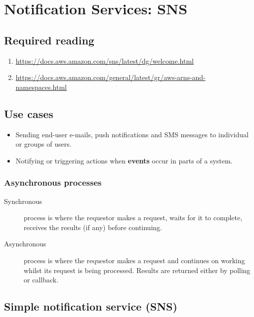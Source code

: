 \chapter{Notification Services: SNS}
\label{ch:sns}
  
\section*{Required reading}\label{required-reading}

\begin{enumerate}
\item
  \url{https://docs.aws.amazon.com/sns/latest/dg/welcome.html}
\item
  \url{https://docs.aws.amazon.com/general/latest/gr/aws-arns-and-namespaces.html}
\end{enumerate}

\section{Use cases}\label{use-cases}

\begin{itemize}
\item
  Sending end-user e-mails, push notifications and SMS messages to
  individual or groups of users.
\item
  Notifying or triggering actions when \textbf{events} occur in parts of
  a system.
\end{itemize}

\subsection{Asynchronous processes}\label{asynchronous-processes}

\begin{description}
\item[Synchronous]
process is where the requestor makes a request, waits for it to
complete, receives the results (if any) before continuing.
\item[Asynchronous]
process is where the requestor makes a request and continues on working
whilst its request is being processed. Results are returned either by
polling or callback.
\end{description}

\section{Simple notification service
(SNS)}\label{simple-notification-service-sns}

